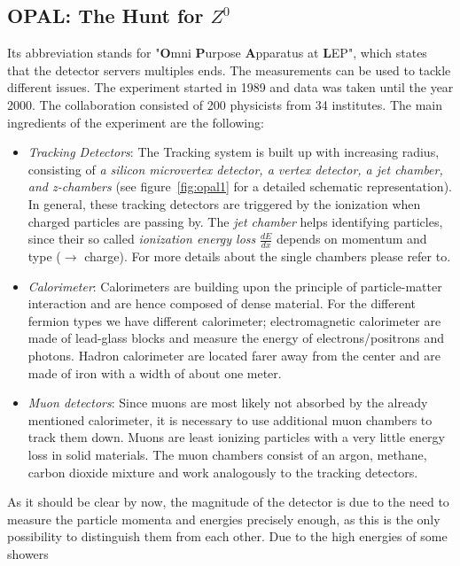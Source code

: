 \subsection{\textbf{OPAL}: The Hunt for $Z^0$}
\label{sub:OPAL}
Its abbreviation stands for  "\textbf{O}mni \textbf{P}urpose \textbf{A}pparatus at \textbf{L}EP", which states that the
detector servers multiples ends. The measurements can be used to tackle different issues. The experiment started in
1989 and data was taken until the year 2000. The collaboration consisted of 200 physicists from 34 institutes.
The main ingredients of the experiment are the following: 
\begin{itemize}
    \item \emph{Tracking Detectors}: The Tracking system is built up with increasing radius, consisting of 
        \textit{a silicon microvertex detector, a vertex detector, a jet chamber, and z-chambers}\cite{CERN_OPAL} 
        (see figure~\ref{fig:opal1} for a detailed schematic representation). In general, these tracking detectors
    are triggered by the ionization when charged particles are passing by. 
    The \textit{jet chamber} helps identifying particles, since their so
    called \textit{ionization energy loss} $\frac{dE}{dx}$ depends on momentum and type ($\rightarrow$ charge). For
    more details about the single chambers please refer to\cite{CERN_OPAL}.
\item \emph{Calorimeter}: Calorimeters are building upon the principle of particle-matter interaction and are hence
    composed of dense material. For the different fermion types we have different calorimeter; electromagnetic calorimeter
    are made of lead-glass blocks and measure the energy of electrons/positrons and photons. Hadron calorimeter are located
    farer away from the center and are made of iron with a width of about one meter. 
\item \emph{Muon detectors}: Since muons are most likely not absorbed by the already mentioned calorimeter, it is necessary 
        to use additional muon chambers to track them down. Muons are least ionizing particles with a very little energy
        loss in solid materials. The muon chambers consist of an argon, methane, carbon dioxide mixture and work analogously to
        the tracking detectors. 
\end{itemize}
As it should be clear by now, the magnitude of the detector is due to the need to measure the particle momenta and energies
precisely enough, as this is the only possibility to distinguish them from each other. Due to the high energies of some showers
